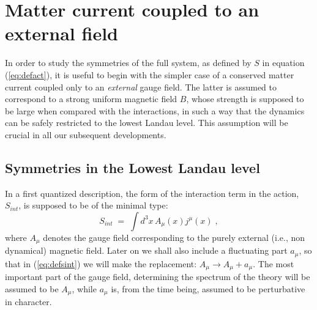 \documentclass[a4paper,12pt]{article}
\begin{document}
\section{Matter current coupled to an external
field}\label{sec:ext}

In order to study the symmetries of the full system, as defined by
$S$
in equation (\ref{eq:defact}), it is useful to begin with the
simpler
case of a conserved matter current coupled only to an {\em
external\/}
gauge field.  The latter is assumed to correspond to a strong
uniform
magnetic field $B$, whose strength is supposed to be large when
compared with the interactions, in such a way that the dynamics can
be
safely restricted to the lowest Landau level. This assumption will
be
crucial in all our subsequent developments.

\subsection{Symmetries in the Lowest Landau level}

In a first quantized description, the form of the interaction term
in
the action, $S_{int}$, is supposed to be of the minimal type:
\begin{equation}
  \label{eq:defsint}
  S_{int}\;=\; \int d^3x \, A_{\mu}(x) j^\mu (x) \;,
\end{equation}
where $A_\mu$ denotes the gauge field corresponding to the purely
external (i.e., non dynamical) magnetic field. Later on we shall
also
include a fluctuating part $a_\mu$, so that in (\ref{eq:defsint})
we
will make the replacement: $A_\mu \to A_\mu + a_\mu$.  The most
important part
of the gauge field, determining the spectrum of the theory will be
assumed to be $A_\mu$, while $a_\mu$ is, from the time being,
assumed to
be perturbative in character.
\end{document}
